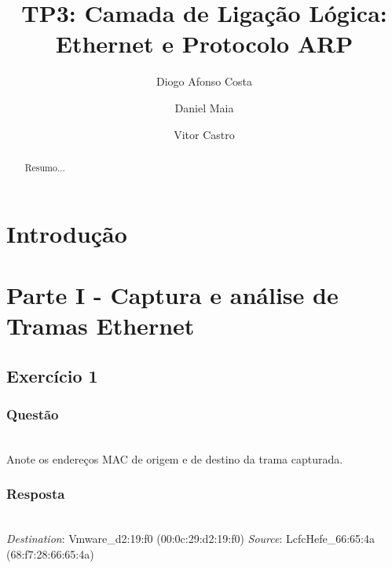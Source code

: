 \documentclass{llncs}
\begin{document}
\mainmatter
\title{TP3: Camada de Ligação Lógica: Ethernet e Protocolo ARP}


\author{Diogo Afonso Costa \and Daniel Maia \and Vitor Castro}



\date{}


\maketitle
\begin{abstract}
Resumo...
\end{abstract}

\section{Introdução}



\clearpage
\section{Parte I - Captura e análise de Tramas Ethernet}

\subsection{Exercício 1}
\subsubsection{Questão}\rule[-10pt]{0pt}{10pt}\\

Anote os endereços MAC de origem e de destino da trama capturada.

\subsubsection{Resposta}\rule[-10pt]{0pt}{10pt}\\

\textit{Destination}: Vmware\_d2:19:f0 (00:0c:29:d2:19:f0)
\textit{Source}: LcfcHefe\_66:65:4a (68:f7:28:66:65:4a)
\end{document}
